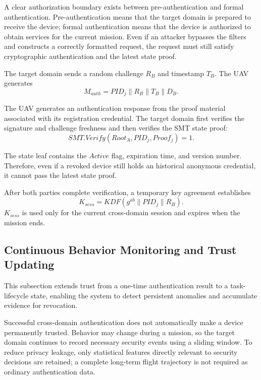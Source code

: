 \documentclass[lettersize,journal]{IEEEtran}
\begin{document}
	A clear authorization boundary exists between pre-authentication and formal authentication. Pre-authentication means that the target domain is prepared to receive the device; formal authentication means that the device is authorized to obtain services for the current mission. Even if an attacker bypasses the filters and constructs a correctly formatted request, the request must still satisfy cryptographic authentication and the latest state proof.
	
	The target domain sends a random challenge $R_B$ and timestamp $T_B$. The UAV generates
	\begin{equation}
		M_{auth}=PID_j\parallel R_B\parallel T_B\parallel D_B.
	\end{equation}
	
	The UAV generates an authentication response from the proof material associated with its registration credential. The target domain first verifies the signature and challenge freshness and then verifies the SMT state proof:
	\begin{equation}
		SMT.Verify(Root_A,PID_j,Proof_j)=1.
	\end{equation}
	
	The state leaf contains the $Active$ flag, expiration time, and version number. Therefore, even if a revoked device still holds an historical anonymous credential, it cannot pass the latest state proof.
	
	After both parties complete verification, a temporary key agreement establishes
	\begin{equation}
		K_{sess}=KDF(g^{ab}\parallel PID_j\parallel R_B).
	\end{equation}
	$K_{sess}$ is used only for the current cross-domain session and expires when the mission ends.
	
	\subsection{Continuous Behavior Monitoring and Trust Updating}
	This subsection extends trust from a one-time authentication result to a task-lifecycle state, enabling the system to detect persistent anomalies and accumulate evidence for revocation.
	
	
	Successful cross-domain authentication does not automatically make a device permanently trusted. Behavior may change during a mission, so the target domain continues to record necessary security events using a sliding window. To reduce privacy leakage, only statistical features directly relevant to security decisions are retained; a complete long-term flight trajectory is not required as ordinary authentication data.
	
\end{document}
